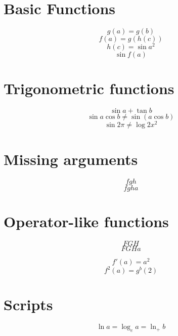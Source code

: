 \documentclass{article}
\begin{document}
\section{Basic Functions}
\[ g(a) = g(b) \]
\[ f(a) = g(h(c)) \]
\[ h(c) = \sin a^2 \]
\[ \sin f(a) \]

\section{Trigonometric functions}
\[ \sin a + \tan b \]
\[ \sin a \cos b \neq \sin(a\cos b)\]
\[ \sin 2\pi \neq \log 2x^2 \]

\section{Missing arguments}
\[ f g h \]
\[ f g h a \]
\section{Operator-like functions}
\[ F G H \]
\[ F G H a \]

\[ f'(a) = a^2 \]
\[ f^2(a) = g^b(2) \]

\section{Scripts}
\[ \ln a = \log_e a = \ln_{+} b\]
\end{document}

